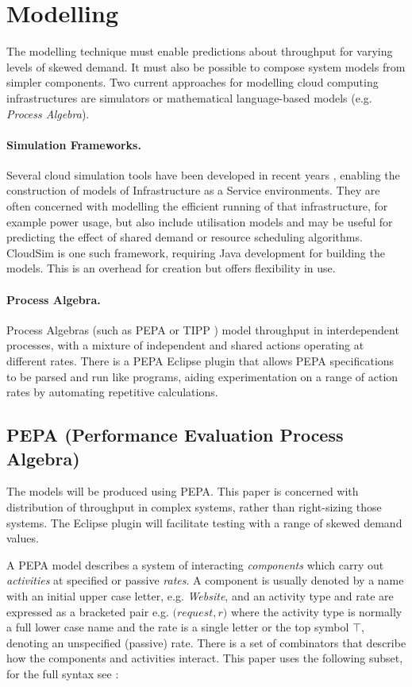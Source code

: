 \documentclass[runningheads]{llncs}
\begin{document}
\section{Modelling}\label{sec:modelling}

The modelling technique must enable predictions about throughput for varying levels of skewed demand.  It must also be possible to compose system models from simpler components.  Two current approaches for modelling cloud computing infrastructures are simulators or mathematical language-based models (e.g. {\itshape Process Algebra}).

\paragraph{Simulation Frameworks.} Several cloud simulation tools have been developed in recent years \cite{RN1081}, enabling the construction of models of Infrastructure as a Service environments.  They are often concerned with modelling the efficient running of that infrastructure, for example power usage, but also include utilisation models and may be useful for predicting the effect of shared demand or resource scheduling algorithms.  CloudSim \cite{RN69} is one such framework, requiring Java development for building the models.  This is an overhead for creation but offers flexibility in use.

\paragraph{Process Algebra.} Process Algebras (such as PEPA or TIPP \cite{RN64}) model throughput in interdependent processes, with a mixture of independent and shared actions operating at different rates.  There is a PEPA Eclipse plugin \cite{RN1080} that allows PEPA specifications to be parsed and run like programs, aiding experimentation on a range of action rates by automating repetitive calculations.

\subsection{PEPA (Performance Evaluation Process Algebra)}

The models will be produced using PEPA.  This paper is concerned with distribution of throughput in complex systems, rather than right-sizing those systems.  The Eclipse plugin will facilitate testing with a range of skewed demand values.

A PEPA model describes a system of interacting {\itshape components} which carry out {\itshape activities} at specified or passive {\itshape rates}.  A component is usually denoted by a name with an initial upper case letter, e.g. {\itshape Website}, and an activity type and rate are expressed as a bracketed pair e.g. $\mathit(request, r)$ where the activity type is normally a full lower case name and the rate is a single letter or the top symbol $\top$, denoting an unspecified (passive) rate.  There is a set of combinators that describe how the components and activities interact.  This paper uses the following subset, for the full syntax see {\cite{RN1051}}:
\end{document}
